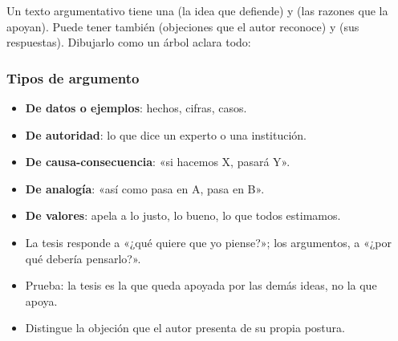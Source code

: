 

Un texto argumentativo tiene una  (la idea que defiende) y  (las razones que la apoyan).
Puede tener también  (objeciones que el autor reconoce) y  (sus respuestas).
Dibujarlo como un árbol aclara todo:


\subsubsection{Tipos de argumento}
\begin{itemize}
  \item \textbf{De datos o ejemplos}: hechos, cifras, casos.
  \item \textbf{De autoridad}: lo que dice un experto o una institución.
  \item \textbf{De causa-consecuencia}: «si hacemos X, pasará Y».
  \item \textbf{De analogía}: «así como pasa en A, pasa en B».
  \item \textbf{De valores}: apela a lo justo, lo bueno, lo que todos estimamos.
\end{itemize}

\begin{regla}
\begin{itemize}
  \item La tesis responde a «¿qué quiere que yo piense?»; los argumentos, a «¿por qué debería pensarlo?».
  \item Prueba: la tesis es la que queda apoyada por las demás ideas, no la que apoya.
  \item Distingue la objeción que el autor presenta de su propia postura.
\end{itemize}
\end{regla}

